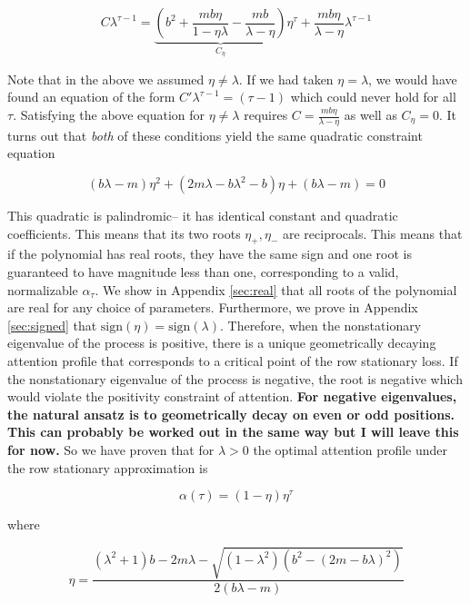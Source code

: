 \documentclass{article}
\begin{document}
\begin{equation}
    C\lambda^{\tau-1} = \underbrace{\left(b^2 + \frac{mb\eta}{1-\eta\lambda} - \frac{mb}{\lambda-\eta}\right)}_{C_\eta}\eta^\tau + \frac{mb\eta}{\lambda-\eta}\lambda^{\tau-1}
\end{equation}

Note that in the above we assumed $\eta\neq \lambda$. If we had taken $\eta = \lambda$, we would have found an equation of the form $C'\lambda^{\tau-1} = (\tau-1)$ which could never hold for all $\tau$. Satisfying the above equation for $\eta \neq \lambda$ requires $C= \frac{mb\eta}{\lambda - \eta}$ as well as $C_\eta = 0$. It turns out that \textit{both} of these conditions yield the same quadratic constraint equation

\begin{equation}\label{quad}
    (b\lambda - m)\eta^2 + (2m\lambda - b\lambda^2 -b)\eta + (b\lambda-m) = 0
\end{equation}

This quadratic is palindromic-- it has identical constant and quadratic coefficients. This means that its two roots $\eta_{+}, \eta_{-}$ are reciprocals. This means that if the polynomial has real roots, they have the same sign and one root is guaranteed to have magnitude less than one, corresponding to a valid, normalizable $\alpha_\tau$. We show in Appendix \ref{sec:real} that all roots of the polynomial are real for any choice of parameters. Furthermore, we prove in Appendix \ref{sec:signed} that $\text{sign}(\eta) = \text{sign}(\lambda)$. Therefore, when the nonstationary eigenvalue of the process is positive, there is a unique geometrically decaying attention profile that corresponds to a critical point of the row stationary loss. If the nonstationary eigenvalue of the process is negative, the root is negative which would violate the positivity constraint of attention. \textbf{For negative eigenvalues, the natural ansatz is to geometrically decay on even or odd positions. This can probably be worked out in the same way but I will leave this for now.} So we have proven that for $\lambda > 0$ the optimal attention profile under the row stationary approximation is 

\begin{equation}
    \alpha(\tau) = (1-\eta)\eta^\tau
\end{equation}

where

\begin{equation}
    \eta = \frac{(\lambda^2 + 1)b - 2m\lambda - \sqrt{(1-\lambda^2)(b^2 - (2m - b\lambda)^2)}}{2(b\lambda - m)}
\end{equation}
\end{document}
